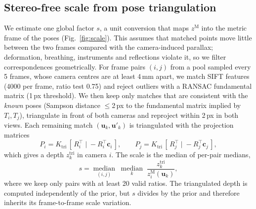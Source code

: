 \documentclass[conference]{IEEEtran}
\begin{document}
\subsection{Stereo-free scale from pose triangulation}
\label{sec:scale}
We estimate one global factor $s$, a unit conversion that maps $z^{\mathrm{M}}$ into the metric frame of the poses (Fig.~\ref{fig:scale}). This assumes that matched points move little between the two frames compared with the camera-induced parallax; deformation, breathing, instruments and reflections violate it, so we filter correspondences geometrically. For frame pairs $(i,j)$ from a pool sampled every 5 frames, whose camera centres are at least 4\,mm apart, we match SIFT features (4000 per frame, ratio test 0.75) and reject outliers with a RANSAC fundamental matrix (1\,px threshold). We then keep only matches that are consistent with the \emph{known} poses (Sampson distance $\le$2\,px to the fundamental matrix implied by $T_i,T_j$), triangulate in front of both cameras and reproject within 2\,px in both views. Each remaining match $(\mathbf{u}_k,\mathbf{u}'_k)$ is triangulated with the projection matrices
\begin{equation}
P_i=K_{\mathrm{tri}}\,[\,R_i^{\top}\;|\;-R_i^{\top}\mathbf{c}_i\,],\qquad P_j=K_{\mathrm{tri}}\,[\,R_j^{\top}\;|\;-R_j^{\top}\mathbf{c}_j\,],
\end{equation}
which gives a depth $z^{\mathrm{tri}}_k$ in camera $i$. The scale is the median of per-pair medians,
\begin{equation}
s=\operatorname*{median}_{(i,j)}\;\operatorname*{median}_{k}\;\frac{z^{\mathrm{tri}}_k}{z^{\mathrm{M}}_i(\mathbf{u}_k)} ,
\label{eq:scale}
\end{equation}
where we keep only pairs with at least 20 valid ratios. The triangulated depth is computed independently of the prior, but $s$ divides by the prior and therefore inherits its frame-to-frame scale variation.
\end{document}
